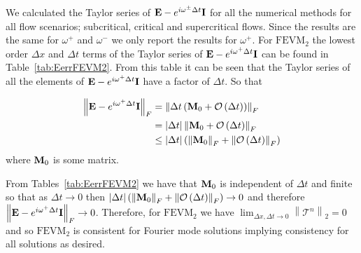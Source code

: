 We calculated the Taylor series of $\mathbf{E} -  e^{i \omega^\pm \Delta t}\mathbf{I}$ for all the numerical methods for all flow scenarios; subcritical, critical and supercritical flows. Since the results are the same for $\omega^+$ and $\omega^-$ we only report the results for $\omega^+$. For $\text{FEVM}_2$ the lowest order $\Delta x$ and $\Delta t$ terms of the Taylor series of $\mathbf{E} -  e^{i \omega^+ \Delta t}\mathbf{I}$ can be found in Table~\ref{tab:EerrFEVM2}. From this table it can be seen that the Taylor series of all the elements of $\mathbf{E} -  e^{i \omega^+ \Delta t}\mathbf{I}$ have a factor of $\Delta t$. So that

\begin{align*}
\left \| \mathbf{E} -  e^{i \omega^+ \Delta t}\mathbf{I} \right \|_F &=  \left \| \Delta t \left(\mathbf{M}_0 +  \mathcal{O}\left(\Delta t\right)\right)\right \|_F  \nonumber\\ &= |\Delta t|  \left \| \mathbf{M}_0 +  \mathcal{O}\left(\Delta t\right)\right \|_F
 \nonumber\\ &\le  |\Delta t| \left(\left \| \mathbf{M}_0 \right \|_F + \left \| \mathcal{O}\left(\Delta t\right)\right \|_F\right)
\end{align*} 
where $\mathbf{M}_0$ is some matrix.

From Tables~\ref{tab:EerrFEVM2} we have that $\mathbf{M}_0$ is independent of $\Delta t$ and finite so that as $\Delta t \rightarrow 0$ then $|\Delta t| \left(\left \| \mathbf{M}_0 \right \|_F + \left \| \mathcal{O}\left(\Delta t\right)\right \|_F\right)  \rightarrow 0$  and therefore  $\left \| \mathbf{E} -  e^{i \omega^+ \Delta t}\mathbf{I} \right \|_F \rightarrow 0$. Therefore, for $\text{FEVM}_2$ we have $ \lim_{\Delta x,\Delta t \rightarrow 0}\left \| \mathcal{T}^n \right \|_2 = 0 $ and so  $\text{FEVM}_2$ is consistent for Fourier mode solutions implying consistency for all solutions as desired. 

